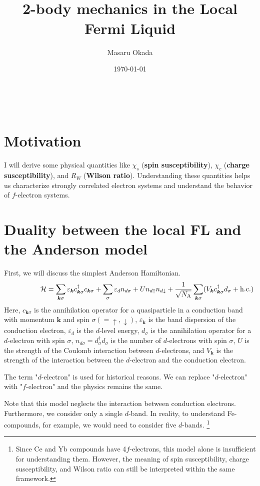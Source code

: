 \documentclass[a4j]{jarticle}
\title{\ \\[-35mm] 2-body mechanics in the Local Fermi Liquid
}
\author{ Masaru Okada}
\date{\today}
\begin{document}
\allowdisplaybreaks
\maketitle

\ \\[-20mm]

\section*{Motivation}


I will derive some physical quantities like $\chi_{s}$ (\textbf{spin susceptibility}), $\chi_{c}$ (\textbf{charge susceptibility}), and $R_{W}$ (\textbf{Wilson ratio}).
Understanding these quantities helps us characterize strongly correlated electron systems and understand the behavior of $f$-electron systems.


\section*{Duality between the local FL and the Anderson model}
First, we will discuss the simplest Anderson Hamiltonian.
\begin{align}
	\hspace{17.3mm}
	\mathcal{H}
	=
	\sum_{\bm{k}\sigma}
	\varepsilon_{\bm{k}}
	c^{\dagger}_{\bm{k} \sigma}
	c_{\bm{k} \sigma}
	+
	\sum_{\sigma}
	\varepsilon_{d}
	n_{d \sigma}
	+
	U
	n_{d \uparrow}
	n_{d \downarrow}
	+
	\frac{1}{\sqrt{N_{\rm A}}}
	\sum_{\bm{k}\sigma}
	(
	V_{\bm{k}}
	c_{\bm{k}\sigma}^{\dagger}
	d_{\sigma}
	+
	{\rm h.c.}
	)
\end{align}
Here, $c_{\bm{k}\sigma}$ is the annihilation operator for a quasiparticle in a conduction band with momentum $\bm{k}$ and spin $\sigma(=\uparrow,\downarrow)$, $\varepsilon_{\bm{k}}$ is the band dispersion of the conduction electron, $\varepsilon_{d}$ is the $d$-level energy, $d_{\sigma}$ is the annihilation operator for a $d$-electron with spin $\sigma$, $n_{d \sigma}=d_{\sigma}^{\dagger} d_{\sigma}$ is the number of $d$-electrons with spin $\sigma$, $U$ is the strength of the Coulomb interaction between $d$-electrons, and $V_{\bm{k}}$ is the strength of the interaction between the $d$-electron and the conduction electron.

The term "$d$-electron" is used for historical reasons.
We can replace "$d$-electron" with "$f$-electron" and the physics remains the same.

Note that this model neglects the interaction between conduction electrons.
Furthermore, we consider only a single $d$-band.
In reality, to understand Fe-compounds, for example, we would need to consider five $d$-bands.
\footnote{
	Since Ce and Yb compounds have 4$f$-electrons, this model alone is insufficient for understanding them.
	However, the meaning of spin susceptibility, charge susceptibility, and Wilson ratio can still be interpreted within the same framework.
}
\end{document}
